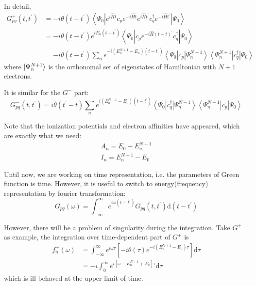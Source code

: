 In detail,
\begin{equation}
\begin{aligned}
	G_{p q}^{+}\left(t, t^{\prime}\right) 
	&=-i \theta\left(t-t^{\prime}\right)\left\langle\Psi_{0}\left|e^{i \hat{H} t} c_{p} e^{-i \hat{H} t} e^{i \hat{H} t^{\prime}} c_{q}^{\dagger} e^{-i \hat{H} t^{\prime}}\right| \Psi_{0}\right\rangle
	\\
	&=- i \theta\left(t-t^{\prime}\right) e^{i E_{0}\left(t-t^{\prime}\right)}\left\langle\Psi_{0}\left|c_{p} e^{-i \hat{H}(t-t)^{\prime}} c_{q}^{\dagger}\right| \Psi_{0}\right\rangle
	\\
	&=-i \theta\left(t-t^{\prime}\right) \sum_{n} e^{-i\left(E_{n}^{N+1}-E_{0}\right)\left(t-t^{\prime}\right)}\left\langle\Psi_{0}\left|c_{p}\right| \Psi_{n}^{N+1}\right\rangle\left\langle\Psi_{n}^{N+1}\left|c_{q}^{\dagger}\right| \Psi_{0}\right\rangle
\end{aligned}
\end{equation}
where $\ket{\Psi_n^{N+1}}$ is the orthonomal set of eigenstates of Hamiltonian with $N+1$ electrons.

It is similar for the $G^{-}$ part:
\begin{equation}
G_{p q}^{-}\left(t, t^{\prime}\right)=i \theta\left(t^{\prime}-t\right) \sum_{n} e^{i\left(E_{n}^{N-1}-E_{0}\right)\left(t-t^{\prime}\right)}\left\langle\Psi_{0}\left|c_{q}^{\dagger}\right| \Psi_{n}^{N-1}\right\rangle\left\langle\Psi_{n}^{N-1}\left|c_{p}\right| \Psi_{0}\right\rangle
\end{equation}

Note that the ionization potentials and electron affinities have appeared, which are exactly what we need:
\begin{equation}
\begin{array}{l}{A_{n}=E_{0}-E_{n}^{N+1}} \\ {I_{n}=E_{n}^{N-1}-E_{0}}\end{array}
\end{equation}

Until now, we are working on time representation, i.e. the parameters of Green function is time.
However, it is useful to switch to energy(frequency) representation by fourier transformation:
\begin{equation}
G_{p q}(\omega)=\int_{-\infty}^{\infty} e^{i \omega\left(t-t^{\prime}\right)} G_{p q}\left(t, t^{\prime}\right) \mathrm{d}\left(t-t^{\prime}\right)
\end{equation}

However, there will be a problem of singularity during the integration.
Take $G^{+}$ as example, the integration over time-dependent part of $G^{+}$ is
\begin{equation}
\begin{aligned} f_{n}^{+}(\omega) &=\int_{-\infty}^{\infty} e^{i \omega \tau}\left[-i \theta(\tau) e^{-i\left(E_{n}^{N+1}-E_{0}\right) \tau}\right] \mathrm{d} \tau \\ &=-i \int_{0}^{\infty} e^{i\left[\omega-E_{n}^{N+1}+E_{0}\right] \tau} \mathrm{d} \tau \end{aligned}
\end{equation}
which is ill-behaved at the upper limit of time.

